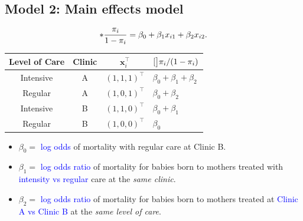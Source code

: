 \documentclass{article}\usepackage[]{graphicx}\usepackage[svgnames]{xcolor}
\let\log\relax%
\providecommand{\Vector}[1]{\bm{#1}}%
\begin{document}
\subsection*{Model 2: Main effects model}
\[ \log*{\frac{\pi_i}{1-\pi_i}}=\beta_0+\beta_1x_{i1}+\beta_2x_{i2}. \]
\begin{table}[!htbp]
      \centering
      \begin{tabular}{cccl}
            Level of Care & Clinic & $ \Vector{x}_i^\top $ & $ \log[\big]{\pi_i/(1-\pi_i)} $ \\
            \midrule
            Intensive     & A      & $ (1,1,1)^\top $      & $ \beta_0+\beta_1+\beta_2 $     \\
            Regular       & A      & $ (1,0,1)^\top $      & $ \beta_0+\beta_2 $             \\
            Intensive     & B      & $ (1,1,0)^\top $      & $ \beta_0+\beta_1 $             \\
            Regular       & B      & $ (1,0,0)^\top $      & $ \beta_0 $                     \\
            \bottomrule
      \end{tabular}
\end{table}
\begin{itemize}
      \item $ \beta_0= $ \textcolor{Blue}{log odds} of mortality with regular care at Clinic B.
      \item $ \beta_1= $ \textcolor{Blue}{log odds ratio} of mortality for babies born to mothers treated with
            \textcolor{Blue}{intensity vs regular} care at the \emph{same clinic}.
      \item $ \beta_2= $ \textcolor{Blue}{log odds ratio} of mortality for babies born to mothers treated at
            \textcolor{Blue}{Clinic A vs Clinic B} at the \emph{same level of care}.
\end{itemize}
\end{document}
